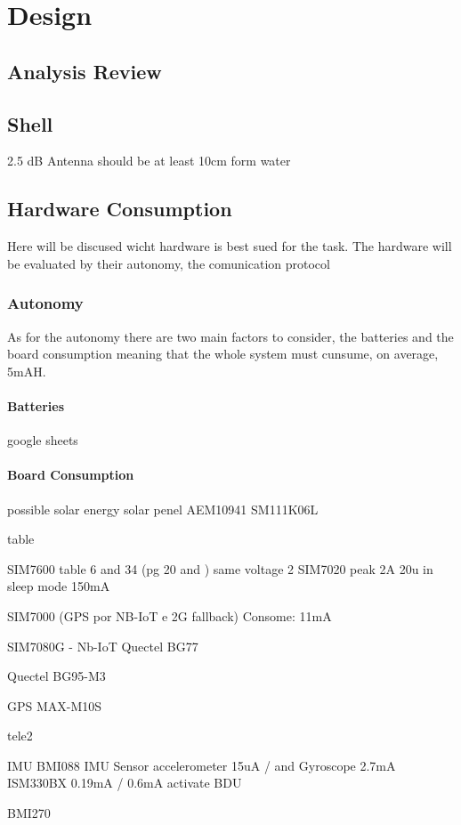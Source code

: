 
\chapter{Design}
\section{Analysis Review}

\section{Shell}
2.5 dB Antenna should be at least 10cm form water 

\section{Hardware Consumption}
Here will be discused wicht hardware is best sued for the task. The hardware will be evaluated by their
autonomy, the comunication protocol
\subsection{Autonomy}
As for the autonomy there are two main factors to consider, the batteries and the board consumption
meaning that the whole system must cunsume, on average, 5mAH.
\subsubsection{Batteries}
google sheets

\subsubsection{Board Consumption}

possible solar energy
solar penel
AEM10941
SM111K06L

table

SIM7600 
table 6 and 34 (pg 20 and ) same voltage
2
SIM7020
peak 2A 20u in sleep mode 150mA

SIM7000 (GPS por NB-IoT e 2G fallback)
Consome: 11mA

SIM7080G - Nb-IoT
Quectel BG77

Quectel BG95-M3

 
GPS
MAX-M10S

tele2

IMU
BMI088 IMU Sensor
accelerometer 15uA  / and Gyroscope 2.7mA
ISM330BX
0.19mA / 0.6mA
activate BDU

BMI270



